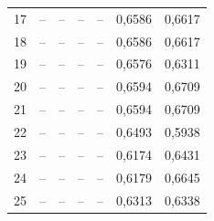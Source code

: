 \begin{table}[htbp]
\begin{tabular}{rrrrrrr}
17 & -- & -- & -- & -- & 0,6586 & 0,6617 \\
18 & -- & -- & -- & -- & 0,6586 & 0,6617 \\
19 & -- & -- & -- & -- & 0,6576 & 0,6311 \\
20 & -- & -- & -- & -- & 0,6594 & 0,6709 \\
21 & -- & -- & -- & -- & 0,6594 & 0,6709 \\
22 & -- & -- & -- & -- & 0,6493 & 0,5938 \\
23 & -- & -- & -- & -- & 0,6174 & 0,6431 \\
24 & -- & -- & -- & -- & 0,6179 & 0,6645 \\
25 & -- & -- & -- & -- & 0,6313 & 0,6338 \\
\bottomrule
\end{tabular}
\end{table}

\clearpage
